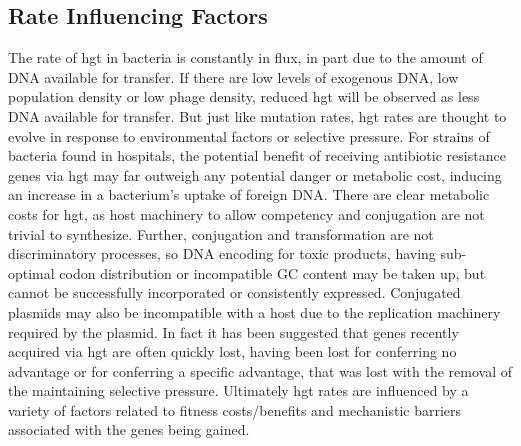 \subsection*{Rate Influencing Factors}
The rate of \ac{hgt} in bacteria is constantly in flux, in part due to the amount of DNA available for transfer\citep{trendbs}.
If there are low levels of exogenous DNA, low population density or low phage density, reduced \ac{hgt} will be observed as less DNA available for transfer\citep{lgt}.
But just like mutation rates, \ac{hgt} rates are thought to evolve in response to environmental factors or selective pressure\citep{mtrate,hgtrate}.
For strains of bacteria found in hospitals, the potential benefit of receiving antibiotic resistance genes via \ac{hgt} may far outweigh any potential danger or metabolic cost, inducing an increase in a bacterium's uptake of foreign DNA.\citep{hospital}
There are clear metabolic costs for \ac{hgt}, as host machinery to allow competency and conjugation are not trivial to synthesize\citep{hgtcost}.
Further, conjugation and transformation are not discriminatory processes, so DNA encoding for toxic products, having sub-optimal codon distribution or incompatible GC content may be taken up, but cannot be successfully incorporated or consistently expressed\citep{hgtcost}.
Conjugated plasmids may also be incompatible with a host due to the replication machinery required by the plasmid\citep{plasincom}.
In fact it has been suggested that genes recently acquired via \ac{hgt} are often quickly lost, having been lost for conferring no advantage or for conferring a specific advantage, that was lost with the removal of the maintaining selective pressure\citep{fastlane}.
Ultimately \ac{hgt} rates are influenced by a variety of factors related to fitness costs/benefits and mechanistic barriers associated with the genes being gained.
